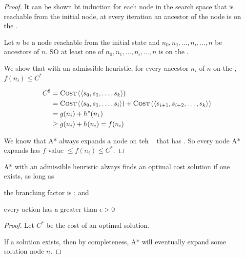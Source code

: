 \begin{listu}
\begin{proof}
        It can be shown bt induction for each node in the search space that is reachable from the initial node, at every iteration an ancestor of the node is on the \Frontier.

        Let $n$ be a node reachable from the initial state and $n_0, n_1, \dots, n_i, \dots, n$ be ancestors of $n$. SO at least one of $n_0, n_1, \dots, n_i, \dots, n$ is  on the \Frontier.

        We show that with an admissible heuristic, for every ancestor $n_i$ of $n$ on the \Frontier, $f(n_i) \le C^*$

        \begin{align*}
            C^8 & = \textsc{Cost} \left( \langle s_0, s_1, \dots, s_k \rangle \right)                                                                             \\
                & = \textsc{Cost} \left( \langle s_0, s_1, \dots, s_i \rangle \right) + \textsc{Cost} \left( \langle s_{i+1}, s_{i+2}, \dots, s_k \rangle \right) \\
                & = g(n_i) + h^*(n_1)                                                                                                                             \\
                & \ge  g(n_i) + h(n_i) = f(n_i)
        \end{align*}

        We know that A* always expands a node on teh \Frontier~ that has . So every node A* expands has $f$-value $\le f(n_i) \le C^*$.
    \end{proof}

    \begin{theorem}\label{thm:optimality-of-astar}
        A* with an admissible heuristic always finds an optimal cost solution if one exists, as long as 

        \begin{listu}
            \item the branching factor is ; and
            \item every action has a  greater than $\epsilon > 0$
        \end{listu}
    \end{theorem}

    \begin{proof}
        Let $C^*$ be the cost of an optimal solution. 

        If a solution exists, then by completeness, A* will eventually expand some solution node $n$. 


\end{proof}
\end{listu}
